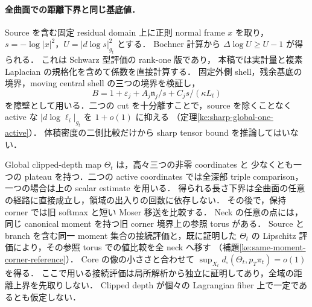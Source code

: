 \paragraph{全曲面での距離下界と同じ基底値．}
Source を含む固定 residual domain 上に正則 normal frame $x$ を取り，
$s=-\log|x|^2$，$U=|d\log s|_{g_t}^2$ とする．
Bochner 計算から $\Delta\log U\ge U-1$ が得られる．
これは Schwarz 型評価\cite{YauSchwarz}の rank-one 版であり，
本稿では実計量と複素 Laplacian の規格化を含めて係数を直接計算する．
固定外側 shell，残余基底の境界，moving central shell の三つの境界を検証し，
\[
 B=1+\varepsilon_j+A_j\mathfrak n_j/s+C_js/(\kappa L_t)
\]
を障壁として用いる．二つの cut を十分離すことで，source を除くことなく
active な $|d\log\ell_i|_{g_t}$ を $1+o(1)$ に抑える
（定理\ref{ke:sharp-global-one-active}）．
体積密度の二側比較だけから sharp tensor bound を推論してはいない．

Global clipped-depth map $\Theta_t$ は，高々三つの非零 coordinates と
少なくとも一つの plateau を持つ．二つの active coordinates では全深部 triple comparison，
一つの場合は上の scalar estimate を用いる．
得られる長さ下界は全曲面の任意の経路に直接成立し，領域の出入りの回数に依存しない．
その後で，保持 corner では旧 softmax と短い Moser 移送を比較する．
Neck の任意の点には，同じ canonical moment を持つ旧 corner 境界上の参照 torus がある．
Source と branch を含む同一 moment 集合の接続評価と，既に証明した
$\Theta_t$ の Lipschitz 評価により，その参照 torus での値比較を全 neck へ移す
（補題\ref{ke:same-moment-corner-reference}）．
Core の像の小ささと合わせて
$\sup_{X_t}d_\square(\Theta_t,p_T\pi_t)=o(1)$ を得る．
ここで用いる接続評価は局所解析から独立に証明してあり，全域の距離上界を先取りしない．
Clipped depth が個々の Lagrangian fiber 上で一定であるとも仮定しない．

